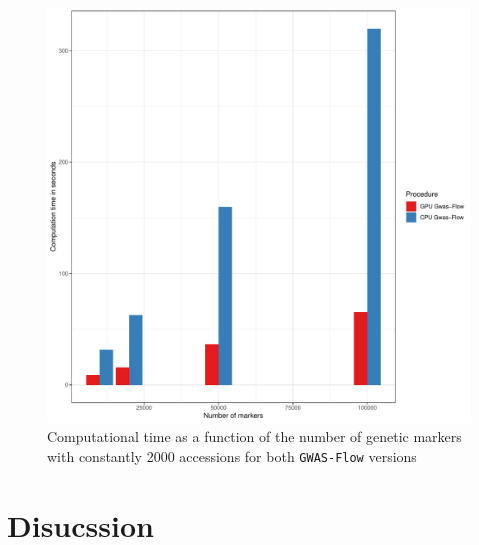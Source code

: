 \begin{figure}[th]
\centering
\includegraphics[height=.55\textheight, width=1.1\textwidth]{Figures/time_markers_gwas}
\decoRule
\caption[Computation time vs number of markers]{Computational time as a function of the number of genetic markers with constantly 2000 accessions for both \texttt{GWAS-Flow} versions}
\label{fig:time_marker}
\end{figure}

\section{Disucssion}


